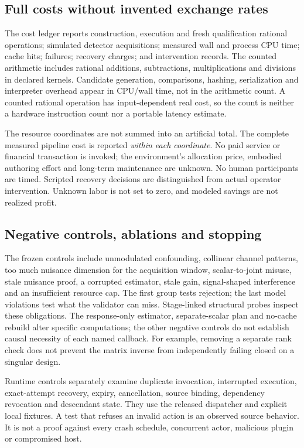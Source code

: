 \documentclass[11pt]{article}
\begin{document}
\subsection{Full costs without invented exchange rates}

The cost ledger reports construction, execution and fresh qualification rational operations; simulated detector acquisitions; measured wall and process CPU time; cache hits; failures; recovery charges; and intervention records. The counted arithmetic includes rational additions, subtractions, multiplications and divisions in declared kernels. Candidate generation, comparisons, hashing, serialization and interpreter overhead appear in CPU/wall time, not in the arithmetic count. A counted rational operation has input-dependent real cost, so the count is neither a hardware instruction count nor a portable latency estimate.

The resource coordinates are not summed into an artificial total. The complete measured pipeline cost is reported \emph{within each coordinate}. No paid service or financial transaction is invoked; the environment's allocation price, embodied authoring effort and long-term maintenance are unknown. No human participants are timed. Scripted recovery decisions are distinguished from actual operator intervention. Unknown labor is not set to zero, and modeled savings are not realized profit.

\subsection{Negative controls, ablations and stopping}

The frozen controls include unmodulated confounding, collinear channel patterns, too much nuisance dimension for the acquisition window, scalar-to-joint misuse, stale nuisance proof, a corrupted estimator, stale gain, signal-shaped interference and an insufficient resource cap. The first group tests rejection; the last model violations test what the validator can miss. Stage-linked structural probes inspect these obligations. The response-only estimator, separate-scalar plan and no-cache rebuild alter specific computations; the other negative controls do not establish causal necessity of each named callback. For example, removing a separate rank check does not prevent the matrix inverse from independently failing closed on a singular design.

Runtime controls separately examine duplicate invocation, interrupted execution, exact-attempt recovery, expiry, cancellation, source binding, dependency revocation and descendant state. They use the released dispatcher and explicit local fixtures. A test that refuses an invalid action is an observed source behavior. It is not a proof against every crash schedule, concurrent actor, malicious plugin or compromised host.
\end{document}
